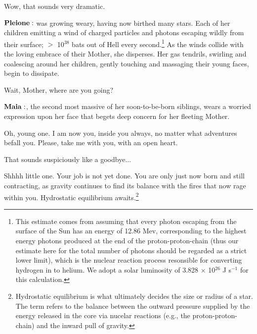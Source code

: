 \documentclass[main.tex]{subfiles}
\begin{document}
\Maia Wow, that sounds very dramatic.

$\Pleione$ was growing weary, having now birthed many stars.  Each of her children emitting a wind of charged particles and photons escaping wildly from their surface; $>$ 10$^{38}$ bats out of Hell every second.\footnote{This estimate comes from assuming that every photon escaping from the surface of the Sun has an energy of 12.86 Mev, corresponding to the highest energy photons produced at the end of the proton-proton-chain (thus our estimate here for the total number of photons should be regarded as a strict lower limit), which is the nuclear reaction process resonsible for converting hydrogen in to helium.  We adopt a solar luminosity of 3.828 $\times$ 10$^{26}$ J s$^{-1}$ for this calculation.}  As the winds collide with the loving embrace of their Mother, she disperses.  Her gas tendrils, swirling and coalescing around her children, gently touching and massaging their young faces, begin to dissipate.

\Maia Wait, Mother, where are you going?  

$\Maia$, the second most massive of her soon-to-be-born siblings, wears a worried expression upon her face that begets deep concern for her fleeting Mother.  





\Pleione Oh, young one.  I am now you, inside you always, no matter what adventures befall you.  Please, take me with you, with an open heart.

\Maia That sounds suspiciously like a goodbye...

\Pleione Shhhh little one.  Your job is not yet done.  You are only just now born and still contracting, as gravity continues to find its balance with the fires that now rage within you.  Hydrostatic equilibrium awaits.\footnote{Hydrostatic equilibrium is what ultimately decides the size or radius of a star.  The term refers to the balance between the outward pressure supplied by the energy released in the core via nucelar reactions (e.g., the proton-proton-chain) and the inward pull of gravity.}
\end{document}
